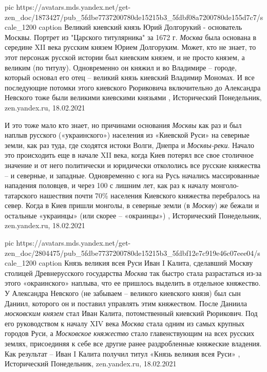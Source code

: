 \ifcmt
  pic https://avatars.mds.yandex.net/get-zen_doc/1873427/pub_5fdbe7737200780de15215b3_5fdbf08a7200780de155d7c7/scale_1200
	caption Великий киевский князь Юрий Долгорукий - основатель Москвы. Портрет из "Царского титулярника" за 1672 г.
\fi
\emph{Москва} была основана в середине XII века русским князем Юрием Долгоруким.
Может, кто не знает, то этот персонаж русской истории был киевским князем, и не
просто князем, а великим (по титулу). Одновременно он княжил и во Владимире –
городе, который основал его отец – великий князь киевский Владимир Мономах. И
все последующие потомки этого киевского Рюриковича включительно до Александра
Невского тоже были великими киевскими князьями
, 
Исторический Понедельник, zen.yandex.ru, 18.02.2021

И это тоже мало кто знает, но причинами основания \emph{Москвы} как раз и был наплыв
русского («украинского») населения из «Киевской Руси» на северные земли, как
раз туда, где сходятся истоки Волги, Днепра и \emph{Москвы-реки}. Начало это
происходить еще в начале XII века, когда Киев потерял все свое столичное
значение и от него политически и юридически откололись все русские княжества –
и северные, и западные.  Одновременно с юга на Русь начались массированные
нападения половцев, и через 100 с лишним лет, как раз к началу
монголо-татарского нашествия почти 70\% населения Киевского княжества
перебралось на север. Когда в Киев пришли монголы, в северные земли (в \emph{Москву})
же бежали и остальные «украинцы» (или скорее – «окраинцы»)
, 
Исторический Понедельник, zen.yandex.ru, 18.02.2021

\ifcmt
  pic https://avatars.mds.yandex.net/get-zen_doc/2804475/pub_5fdbe7737200780de15215b3_5fdbf12e7c919e46c07eee04/scale_1200
	caption Князь великия всея Руси Иван I Калита, сделавший Москву столицей Древнерусского государства
\fi
\emph{Москва} так быстро стала разрастаться из-за этого «окраинского» наплыва, что ее
пришлось выделить в отдельное княжество. У Александра Невского (не забываем –
великого киевского князя) был сын Даниил, которого он и поставил управлять этим
княжеством. После Даниила \emph{московским князем} стал Иван Калита, потомственный
киевский Рюрикович. Под его руководством к началу XIV века \emph{Москва} стала одним
из самых крупных городов Руси, а \emph{Московское княжество} стало главенствующим на
всех русских землях, присоединяя к себе все другие ранее раздробленные
княжеские владения. Как результат – Иван I Калита получил титул «Князь великия
всея Руси»
, 
Исторический Понедельник, zen.yandex.ru, 18.02.2021

